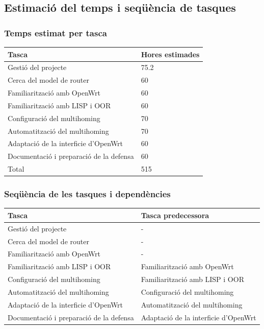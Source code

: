 \documentclass[11pt]{article}
\begin{document}
\subsection{Estimació del temps i seqüència de tasques}
\subsubsection{Temps estimat per tasca}
\begin{center}
	\begin{tabular}{| l | l |}
		\hline
		Tasca & Hores estimades \\ \hline
		Gestió del projecte & 75.2 \\ \hline
		Cerca del model de router & 60 \\ \hline
		Familiarització amb OpenWrt & 60 \\ \hline
		Familiarització amb LISP i OOR & 60 \\ \hline
		Configuració del multihoming & 70 \\ \hline
		Automatització del multihoming & 70 \\ \hline
		Adaptació de la interficie d'OpenWrt & 60 \\ \hline
		Documentació i preparació de la defensa & 60 \\ \hline
		Total & 515 \\ \hline
		\hline
	\end{tabular}
\end{center}

\subsubsection{Seqüència de les tasques i dependències}
\begin{center}
	\begin{tabular}{| l | l |}
		\hline
		Tasca & Tasca predecessora \\ \hline
		Gestió del projecte & - \\ \hline
		Cerca del model de router & - \\ \hline
		Familiarització amb OpenWrt & - \\ \hline
		Familiarització amb LISP i OOR & Familiarització amb OpenWrt \\ \hline
		Configuració del multihoming & Familiarització amb LISP i OOR \\ \hline
		Automatització del multihoming & Configuració del multihoming \\ \hline
		Adaptació de la interficie d'OpenWrt & Automatització del multihoming \\ \hline
		Documentació i preparació de la defensa & Adaptació de la interficie d'OpenWrt \\ \hline
		\hline
	\end{tabular}
\end{center}
\end{document}
